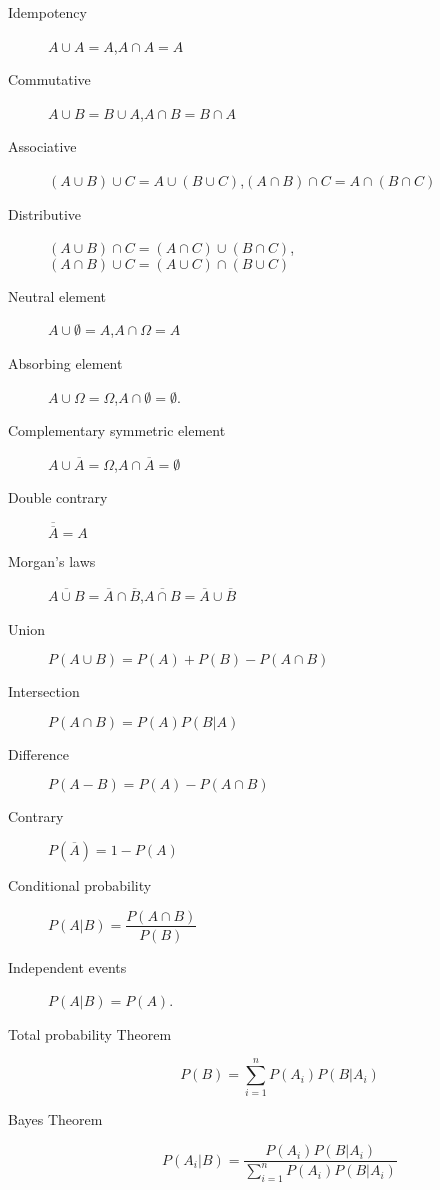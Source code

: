 \begin{multicols*}{2}
\begin{tcolorbox}[hbox, title=Algebra of events]
\begin{minipage}{0.4\textwidth}
\begin{description}
\item[Idempotency] $A\cup A=A$,\quad $A\cap A=A$
\item[Commutative] $A\cup B=B\cup A$,\quad $A\cap B = B\cap A$
\item[Associative] $(A\cup B)\cup C = A\cup (B\cup C)$,\quad $(A\cap B)\cap C = A\cap (B\cap C)$
\item[Distributive] $(A\cup B)\cap C = (A\cap C)\cup (B\cap C)$,\quad $(A\cap B)\cup C = (A\cup C)\cap (B\cup C)$
\item[Neutral element] $A\cup \emptyset=A$,\quad $A\cap \Omega=A$
\item[Absorbing element] $A\cup \Omega=\Omega$,\quad $A\cap \emptyset=\emptyset$.
\item[Complementary symmetric element] $A\cup \overline A = \Omega$,\quad $A\cap \overline A= \emptyset$
\item[Double contrary] $\overline{\overline A} = A$
\item[Morgan's laws] $\overline{A\cup B} = \overline A\cap \overline B$,\quad $\overline{A\cap B} = \overline A\cup \overline B$
\end{description}
\end{minipage}
\end{tcolorbox}

\begin{tcolorbox}[hbox, title=Basic probability]
\begin{minipage}{0.4\textwidth}
\begin{description}
\item [Union] $P(A\cup B)=P(A)+P(B)-P(A\cap B)$
\item [Intersection] $P(A\cap B)=P(A)P(B|A)$
\item [Difference] $P(A-B)=P(A)-P(A\cap B)$
\item [Contrary] $P(\overline{A})=1-P(A)$
\end{description}
\end{minipage}
\end{tcolorbox}

\begin{tcolorbox}[hbox, title=Conditional probability]
\begin{minipage}{0.4\textwidth}
\begin{description}
\item [Conditional probability] $P(A|B)=\dfrac{P(A\cap B)}{P(B)}$
\item [Independent events] $P(A|B)=P(A)$.
\item [Total probability Theorem] \[P(B)=\sum_{i=1}^n P(A_i)P(B|A_i)\]
\item [Bayes Theorem] \[P(A_i|B)=\dfrac{P(A_i)P(B|A_i)}{\sum_{i=1}^n P(A_i)P(B|A_i)}\]
\end{description}
\end{minipage}
\end{tcolorbox}



\end{multicols*}
